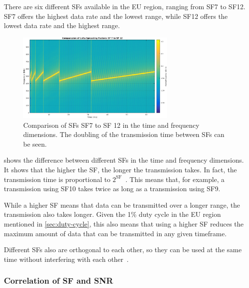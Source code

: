 There are six different \aclp{SF} available in the \ac{EU} region, ranging from \ac{SF}7 to \ac{SF}12.
\ac{SF}7 offers the highest data rate and the lowest range, while \ac{SF}12 offers the lowest data rate and the highest range.

\begin{figure}[htbp]
    \centering
    \includegraphics[width=0.7\textwidth]{pictures/lora/SF_Comparison_7_12.png}
    \caption{
        Comparison of \aclp{SF} \ac{SF}7 to \ac{SF} 12 in the time and frequency dimensions.
        The doubling of the transmission time between \aclp{SF} can be seen.\protect\cite{sakshama_ghoslya_lora_2017}
    }\label{pic:lora-sf-comparison}
\end{figure}

 shows the difference between different \aclp{SF} in the time and frequency dimensions.
It shows that the higher the \ac{SF}, the longer the transmission takes.
In fact, the transmission time is proportional to $2^{\text{SF}}$~\cite{sakshama_ghoslya_lora_2017}.
This means that, for example, a transmission using \ac{SF}10 takes twice as long as a transmission using \ac{SF}9.

While a higher \ac{SF} means that data can be transmitted over a longer range, the transmission also takes longer.
Given the 1\% duty cycle in the \ac{EU} region mentioned in \cref{sec:duty-cycle}, this also means that using a higher \ac{SF} reduces the maximum amount of data that can be transmitted in any given timeframe.

Different \aclp{SF} also are orthogonal to each other, so they can be used at the same time without interfering with each other~\cite{the_things_network_spreading_2023}.

\subsubsection{Correlation of \acs{SF} and \acs{SNR}}\label{sec:sf-snr-correlation}

